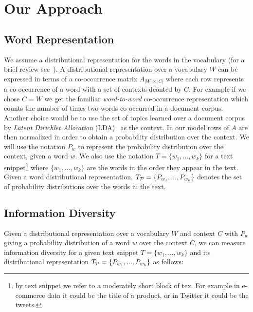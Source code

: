 \documentclass{article} %
\begin{document}
\section{Our Approach}
\label{sec:our-approach}

\subsection{Word Representation}
\label{sec:word-representation}

We assume a distributional representation for the words in the vocabulary (for a brief review
see~\cite{Turian10wordrepresentations}). A distributional representation over a vocabulary $W$ can be expressed in terms of a
co-occurrence matrix $A_{|W|\times|C|}$ where each row represents a co-occurrence of a word with a set of contexts deonted by
$C$. For example if we chose $C=W$ we get the familiar {\sl word-to-word} co-occurrence representation which counts the number
of times two words co-occurred in a document corpus. Another choice would be to use the set of topics learned over a document
corpus by {\sl Latent Dirichlet Allocation} (LDA)~\cite{Blei:2003:LDA:944919.944937} as the context. In our model rows of $A$
are then normalized in order to obtain a probability distribution over the context. We will use the notation $P_w$ to represent
the probability distribution over the context, given a word $w$. We also use the notation $T=\{w_1,...,w_k\}$ for a text
snippet\footnote{by text snippet we refer to a moderately short block of tex. For example in e-commerce data it could be the
title of a product, or in Twitter it could be the tweets.} where
$\{w_1,...,w_k\}$ are the words in the order they appear in the
text. Given a word distributional representation, $T_{{\mathcal P}}=\{P_{w_1},...,P_{w_k}\}$ denotes the set of probability distributions over the words
in the text.


\subsection{Information Diversity}
\label{sec:information-diversity}

Given a distributional representation over a vocabulary $W$ and context $C$ with $P_w$ giving a probability distribution of a
word $w$ over the context $C$, we can measure information diversity for a given text snippet $T=\{w_1,...,w_k\}$ and its
distributional representation $T_{{\mathcal P}}=\{P_{w_1},...,P_{w_k}\}$ as follows:
\end{document}
